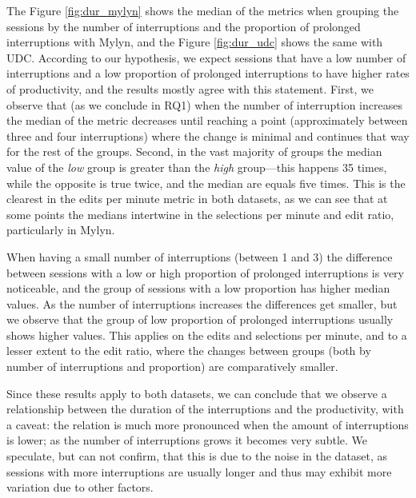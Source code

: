 \documentclass[times]{smrauth}
\begin{document}

The Figure \ref{fig:dur_mylyn} shows the median of the metrics when grouping the sessions by the number of interruptions and the proportion of prolonged interruptions with Mylyn, and the Figure \ref{fig:dur_udc} shows the same with UDC. According to our hypothesis, we expect sessions that have a low number of interruptions and a low proportion of prolonged interruptions to have higher rates of productivity, and the results mostly agree with this statement. First, we observe that (as we conclude in RQ1) when the number of interruption increases the median of the metric decreases until reaching a point (approximately between three and four interruptions) where the change is minimal and continues that way for the rest of the groups. Second, in the vast majority of groups the median value of the \emph{low} group is greater than the \emph{high} group---this happens 35 times, while the opposite is true twice, and the median are equals five times. This is the clearest in the edits per minute metric in both datasets, as we can see that at some points the medians intertwine in the selections per minute and edit ratio, particularly in Mylyn.

When having a small number of interruptions (between 1 and 3) the difference between sessions with a low or high proportion of prolonged interruptions is very noticeable, and the group of sessions with a low proportion has higher median values. As the number of interruptions increases the differences get smaller, but we observe that the group of low proportion of prolonged interruptions usually shows higher values. This applies on the edits and selections per minute, and to a lesser extent to the edit ratio, where the changes between groups (both by number of interruptions and proportion) are comparatively smaller.

Since these results apply to both datasets, we can conclude that we observe a relationship between the duration of the interruptions and the productivity, with a caveat: the relation is much more pronounced when the amount of interruptions is lower; as the number of interruptions grows it becomes very subtle. We speculate, but can not confirm, that this is due to the noise in the dataset, as sessions with more interruptions are usually longer and thus may exhibit more variation due to other factors.
\end{document}
